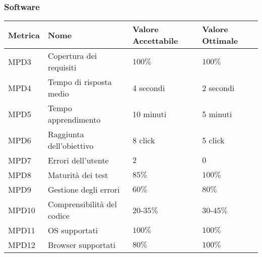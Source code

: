 \subsubsection{Software}
\begin{center}
  \begin{tabular}{|p{2cm}|p{4cm}|p{4cm}|p{3.5cm}|} \hline
    \textbf{Metrica} & \textbf{Nome} & \textbf{Valore Accettabile} & \textbf{Valore Ottimale}    \\ \hline
      MPD3 & Copertura dei requisiti & $100\%$ & $100\%$  \\ \hline
      MPD4 & Tempo di risposta medio    &  4 secondi  &  2 secondi   \\ \hline
      MPD5 & Tempo apprendimento    & 10 minuti  & 5 minuti       \\ \hline
      MPD6 & Raggiunta dell'obiettivo    & 8 click   & 5 click     \\ \hline
      MPD7 & Errori dell'utente    & $2$      & $0$        \\ \hline
      MPD8 & Maturità dei test    & $85\%$ &  $100\%$    \\ \hline
      MPD9 & Gestione degli errori    & $60\%$ & $80\%$     \\ \hline
      MPD10 & Comprensibilità del codice    & $20$-$35\%$ & $30$-$45\%$     \\ \hline
      MPD11 & OS supportati    & $100\%$ & $100\%$     \\ \hline
      MPD12 & Browser supportati    & $80\%$ & $100\%$     \\ \hline
  \end{tabular}
\end{center}
